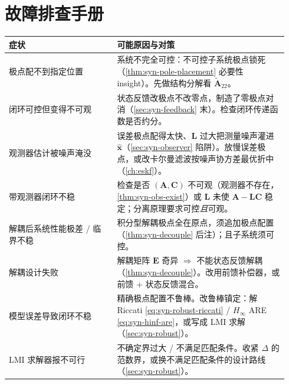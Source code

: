 \section*{故障排查手册}
\begin{table}[H]\centering\small
\begin{tabular}{p{0.36\linewidth}p{0.58\linewidth}}
\toprule
症状 & 可能原因与对策 \\
\midrule
极点配不到指定位置 & 系统不完全可控：不可控子系统极点锁死（\cref{thm:syn-pole-placement} 必要性 insight）。先做结构分解看 $\tilde{\mathbf A}_{22}$。 \\
闭环可控但变得不可观 & 状态反馈改极点不改零点，制造了零极点对消（\cref{sec:syn-feedback} 末）。检查闭环传递函数是否约分。 \\
观测器估计被噪声淹没 & 误差极点配得太快、$\mathbf L$ 过大把测量噪声灌进 $\hat{\mathbf x}$（\cref{sec:syn-observer} 陷阱）。放慢误差极点，或改卡尔曼滤波按噪声协方差最优折中（\cref{ch:eskf}）。 \\
带观测器闭环不稳 & 检查是否 $(\mathbf A,\mathbf C)$ 不可观（观测器不存在，\cref{thm:syn-obs-exist}）或 $\mathbf L$ 未使 $\mathbf A-\mathbf L\mathbf C$ 稳定；分离原理要求可控\emph{且}可观。 \\
解耦后系统性能极差 / 临界不稳 & 积分型解耦极点全在原点，须追加极点配置（\cref{thm:syn-decouple} 后注）；且子系统须可控。 \\
解耦设计失败 & 解耦矩阵 $\mathbf E$ 奇异 $\Rightarrow$ 不能状态反馈解耦（\cref{thm:syn-decouple}）。改用前馈补偿器，或前馈 + 状态反馈混合。 \\
模型误差导致闭环不稳 & 精确极点配置不鲁棒。改鲁棒镇定：解 Riccati \cref{eq:syn-robust-riccati} / $H_\infty$ ARE \cref{eq:syn-hinf-are}，或写成 LMI 求解（\cref{sec:syn-robust}）。 \\
LMI 求解器报不可行 & 不确定界过大 / 不满足匹配条件。收紧 $\Delta$ 的范数界，或换不满足匹配条件的设计路线（\cref{sec:syn-robust}）。 \\
\bottomrule
\end{tabular}
\end{table}
